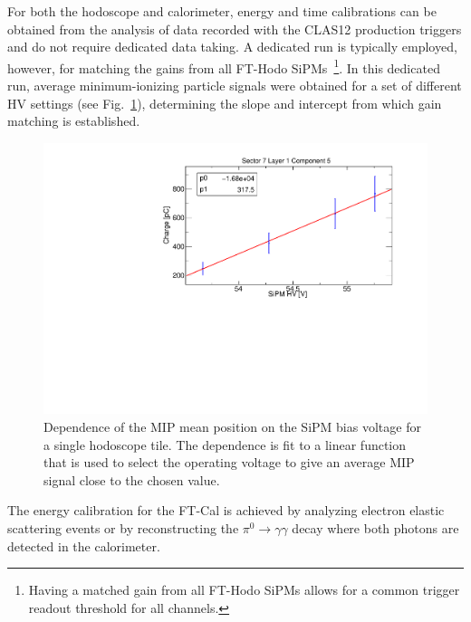 For both the hodoscope and calorimeter, energy and time calibrations can be obtained from the analysis of data
recorded with the CLAS12 production triggers and do not require dedicated data taking. A dedicated run is
typically employed, however, for matching the gains from all FT-Hodo SiPMs~\footnote{Having a matched gain
from all FT-Hodo SiPMs allows for a common trigger readout threshold for all channels.}. In this dedicated run,
average minimum-ionizing particle signals were obtained for a set of different HV settings (see
Fig.~\ref{fig:fthodo_gainmatch}), determining the slope and intercept from which gain matching is established.

\begin{figure}
\includegraphics[width=1.0\columnwidth]{fig/fthodo_gainmatch.pdf}
\caption{Dependence of the MIP mean position on the SiPM bias voltage for a single hodoscope tile. The dependence
  is fit to a linear function that is used to select the operating voltage to give an average MIP signal close to the chosen
  value.}
\label{fig:fthodo_gainmatch}
\end{figure}

The energy calibration for the FT-Cal is achieved by analyzing electron elastic scattering events or by reconstructing
the $\pi^0\to\gamma\gamma$ decay where both photons are detected in the calorimeter. 

